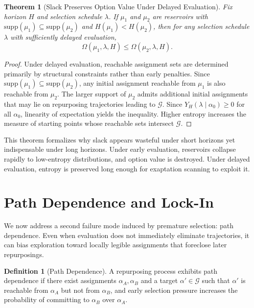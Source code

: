 \documentclass[11pt]{article}
\newtheorem{theorem}{Theorem}
\theoremstyle{definition}
\newtheorem{definition}{Definition}
\begin{document}
\begin{theorem}[Slack Preserves Option Value Under Delayed Evaluation]
Fix horizon $H$ and selection schedule $\lambda$. If $\mu_1$ and $\mu_2$ are reservoirs with $\mathrm{supp}(\mu_1)\subseteq \mathrm{supp}(\mu_2)$ and $H(\mu_1) < H(\mu_2)$, then for any selection schedule $\lambda$ with sufficiently delayed evaluation,
\[
\Omega(\mu_1,\lambda,H) \le \Omega(\mu_2,\lambda,H).
\]
\end{theorem}

\begin{proof}
Under delayed evaluation, reachable assignment sets are determined primarily by structural constraints rather than early penalties. Since $\mathrm{supp}(\mu_1)\subseteq \mathrm{supp}(\mu_2)$, any initial assignment reachable from $\mu_1$ is also reachable from $\mu_2$. The larger support of $\mu_2$ admits additional initial assignments that may lie on repurposing trajectories leading to $\mathcal{G}$. Since $Y_H(\lambda \mid \alpha_0)\ge 0$ for all $\alpha_0$, linearity of expectation yields the inequality. Higher entropy increases the measure of starting points whose reachable sets intersect $\mathcal{G}$.
\end{proof}

This theorem formalizes why slack appears wasteful under short horizons yet indispensable under long horizons. Under early evaluation, reservoirs collapse rapidly to low-entropy distributions, and option value is destroyed. Under delayed evaluation, entropy is preserved long enough for exaptation scanning to exploit it.

\section{Path Dependence and Lock-In}

We now address a second failure mode induced by premature selection: path dependence. Even when evaluation does not immediately eliminate trajectories, it can bias exploration toward locally legible assignments that foreclose later repurposings.

\begin{definition}[Path Dependence]
A repurposing process exhibits path dependence if there exist assignments $\alpha_A,\alpha_B$ and a target $\alpha'\in\mathcal{G}$ such that $\alpha'$ is reachable from $\alpha_A$ but not from $\alpha_B$, and early selection pressure increases the probability of committing to $\alpha_B$ over $\alpha_A$.
\end{definition}
\end{document}

